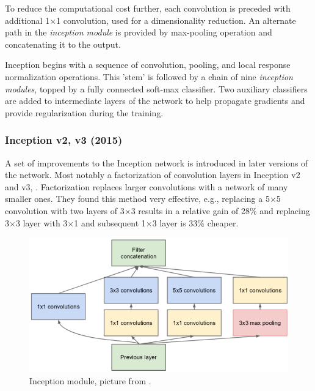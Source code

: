 To reduce the computational cost further, each convolution is preceded with additional 1$\times$1 convolution, used for a dimensionality reduction. An alternate path in the \textit{inception module} is provided by max-pooling operation and concatenating it to the output.

Inception begins with a sequence of convolution, pooling, and local response normalization operations. This 'stem' is followed by a chain of nine \textit{inception modules}, topped by a fully connected soft-max classifier. Two auxiliary classifiers are added to intermediate layers of the network to help propagate gradients and provide regularization during the training.

\subsubsection{Inception v2, v3 (2015)}
A set of improvements to the Inception network is introduced in later versions of the network. Most notably a factorization of convolution layers in Inception v2 and v3, \citeauthor{bib:inception2} \cite{bib:inception2}. Factorization replaces larger convolutions with a network of many smaller ones. They found this method very effective, e.g., replacing a 5$\times$5 convolution with two layers of 3$\times$3 results in a relative gain of 28\% and replacing 3$\times$3 layer with 3$\times$1 and subsequent 1$\times$3 layer is 33\% cheaper.

\begin{figure}
    \includegraphics[width=\textwidth]{img/inception}
    \caption[Inception module]%
    {Inception module, picture from \cite[figure 2]{bib:googlenet}.}
    \label{fig:incept_mod}
\end{figure}

